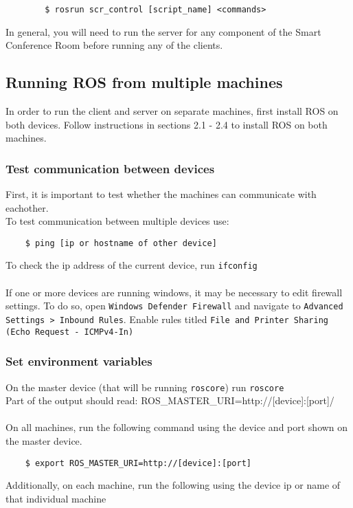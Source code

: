 \documentclass[twoside]{article}
\begin{document}
 	\begin{verbatim}
 	    $ rosrun scr_control [script_name] <commands> 
 	\end{verbatim}
 	In general, you will need to run the server for any component of the Smart Conference Room before running any of the clients.
 	
 	\subsection{Running ROS from multiple machines}
 	In order to run the client and server on separate machines, first install ROS on both devices. Follow instructions in sections 2.1 - 2.4 to install ROS on both machines.
 	
 	\subsubsection{Test communication between devices}
 	First, it is important to test whether the machines can communicate with eachother. \\
 	To test communication between multiple devices use:
 	
 	\begin{verbatim}
 	$ ping [ip or hostname of other device]
 	\end{verbatim}
 	To check the ip address of the current device, run \verb|ifconfig| \\ \\
 	If one or more devices are running windows, it may be necessary to edit firewall settings.
 	To do so, open \verb|Windows Defender Firewall| and navigate to \verb|Advanced Settings > Inbound Rules|. Enable rules titled \verb|File and Printer Sharing (Echo Request - ICMPv4-In)|
 	
 	\subsubsection{Set environment variables}
 	On the master device (that will be running \verb|roscore|) run \verb|roscore| \\
 	Part of the output should read: ROS\_MASTER\_URI=http://[device]:[port]/ \\ \\
 	On all machines, run the following command using the device and port shown on the master device.
 	
 	\begin{verbatim}
 	$ export ROS_MASTER_URI=http://[device]:[port]
 	\end{verbatim}
 	Additionally, on each machine, run the following using the device ip or name of that individual machine
 	
\end{document}
